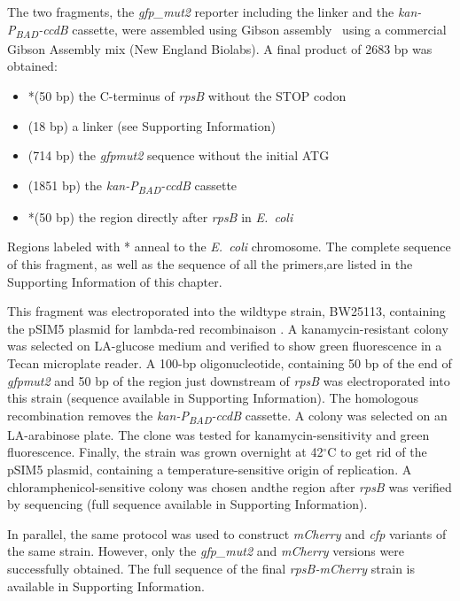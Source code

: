 The two fragments, the \textit{gfp\_mut2} reporter including the linker
and the \textit{kan-P\textsubscript{BAD}-ccdB} cassette, were assembled
using Gibson assembly~\cite{gibson_enzymatic_2009} using a commercial
Gibson Assembly mix (New England Biolabs). A final product of 2683
bp was obtained: 
\begin{itemize}
\item {*}(50 bp) the C-terminus of \textit{rpsB} without the STOP codon 
\item (18 bp) a linker (see Supporting Information) 
\item (714 bp) the \textit{gfpmut2} sequence without the initial ATG 
\item (1851 bp) the \textit{kan-P\textsubscript{BAD}-ccdB} cassette 
\item {*}(50 bp) the region directly after \textit{rpsB} in \textit{E.~coli} 
\end{itemize}
Regions labeled with {*} anneal to the \textit{E.~coli} chromosome.
The complete sequence of this fragment, as well as the sequence of
all the primers,are listed in the Supporting Information of this chapter.

This fragment was electroporated into the wildtype strain, BW25113,
containing the pSIM5 plasmid for lambda-red recombinaison \cite{sharan2009recombineering}.
A kanamycin-resistant colony was selected on LA-glucose medium and
verified to show green fluorescence in a Tecan microplate reader.
A 100-bp oligonucleotide, containing 50 bp of the end of \textit{gfpmut2}
and 50 bp of the region just downstream of \textit{rpsB} was electroporated
into this strain (sequence available in Supporting Information). The
homologous recombination removes the \textit{kan-P\textsubscript{BAD}-ccdB}
cassette. A colony was selected on an LA-arabinose plate. The clone
was tested for kanamycin-sensitivity and  green fluorescence. Finally,
the strain was grown overnight at 42$^{\circ}$C to get rid of the
pSIM5 plasmid, containing a temperature-sensitive origin of replication.
A chloramphenicol-sensitive colony was chosen andthe region after
\textit{rpsB} was verified by sequencing (full sequence available
in Supporting Information).

In parallel, the same protocol was used to construct \textit{mCherry}
and \textit{cfp} variants of the same strain. However, only the \textit{gfp\_mut2}
and \textit{mCherry} versions were successfully obtained. The full
sequence of the final \textit{rpsB-mCherry} strain is available in
Supporting Information.

